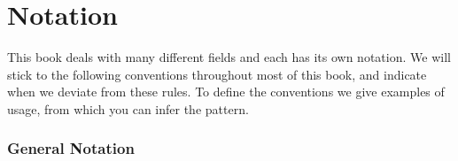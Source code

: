    
\chapter*{Notation}

This book deals with many different fields and each has its own notation. We will stick to the following conventions throughout most of this book, and indicate when we deviate from these rules. To define the conventions we give examples of usage, from which you can infer the pattern.

\subsection*{General Notation}
